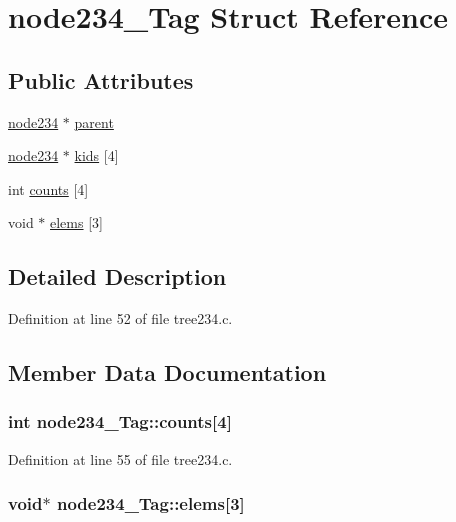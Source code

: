 \hypertarget{structnode234___tag}{
\section{node234\_\-Tag Struct Reference}
\label{structnode234___tag}
}
\subsection*{Public Attributes}
\begin{DoxyCompactItemize}
\item 
\hyperlink{structnode234___tag}{node234} $\ast$ \hyperlink{structnode234___tag_a3c3bdead5844de4df21b2980e7409157}{parent}
\item 
\hyperlink{structnode234___tag}{node234} $\ast$ \hyperlink{structnode234___tag_a0f783514c021d86027beb3211b43f3b7}{kids} \mbox{[}4\mbox{]}
\item 
int \hyperlink{structnode234___tag_a06142da7798558b8c6d59d1cb6471a10}{counts} \mbox{[}4\mbox{]}
\item 
void $\ast$ \hyperlink{structnode234___tag_a0e0167f21d443655f74ca0e24b1bff03}{elems} \mbox{[}3\mbox{]}
\end{DoxyCompactItemize}


\subsection{Detailed Description}


Definition at line 52 of file tree234.c.

\subsection{Member Data Documentation}
\hypertarget{structnode234___tag_a06142da7798558b8c6d59d1cb6471a10}{
\subsubsection[{counts}]{\setlength{\rightskip}{0pt plus 5cm}int {\bf node234\_\-Tag::counts}\mbox{[}4\mbox{]}}}
\label{structnode234___tag_a06142da7798558b8c6d59d1cb6471a10}


Definition at line 55 of file tree234.c.\hypertarget{structnode234___tag_a0e0167f21d443655f74ca0e24b1bff03}{
\subsubsection[{elems}]{\setlength{\rightskip}{0pt plus 5cm}void$\ast$ {\bf node234\_\-Tag::elems}\mbox{[}3\mbox{]}}}
\label{structnode234___tag_a0e0167f21d443655f74ca0e24b1bff03}


